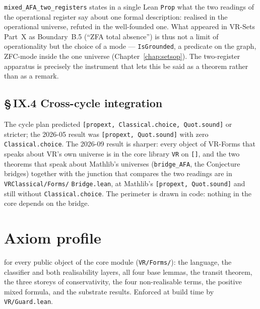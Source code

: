 \begin{remark}
\label{rem:obs9_zfa}
\leanok
{}
\texttt{mixed\_AFA\_two\_registers} states in a single Lean \texttt{Prop}
what the two readings of the operational register say about one formal
description: realised in the operational universe, refuted in the
well-founded one.  What appeared in VR-Sets Part~X as Boundary~B.5 (``ZFA
total absence'') is thus not a limit of operationality but the choice of a
mode --- \texttt{IsGrounded}, a predicate on the graph, ZFC-mode inside
the one universe (Chapter~\ref{chap:setsop}).  The two-register apparatus is
precisely the instrument that lets this be said as a theorem rather than as
a remark.
\end{remark}

\subsection*{\S\,IX.4 Cross-cycle integration}

\begin{remark}
\label{rem:obs10_zero_classical}
\leanok
The cycle plan predicted \texttt{[propext, Classical.choice, Quot.sound]}
or stricter; the 2026-05 result was \texttt{[propext, Quot.sound]} with zero
\texttt{Classical.choice}.  The 2026-09 result is sharper: every object of
VR-Forms that speaks about VR's own universe is in the core library
\texttt{VR} on \texttt{[]}, and the two theorems that speak about Mathlib's
universes (\texttt{bridge\_AFA}, the Conjecture bridges) together with the
junction that compares the two readings are in \texttt{VRClassical/Forms/}
\texttt{Bridge.lean}, at Mathlib's \texttt{[propext, Quot.sound]} and still
without \texttt{Classical.choice}.  The perimeter is drawn in code: nothing
in the core depends on the bridge.
\end{remark}

\section{Axiom profile}
\label{sec:forms_axiom_profile}

\axiomprofile{[]} for every public object of the core module
(\texttt{VR/Forms/}): the language, the classifier and both realisability
layers, all four base lemmas, the transit theorem, the three storeys of
conservativity, the four non-realisable terms, the positive mixed formula,
and the substrate results.  Enforced at build time by
\texttt{VR/Guard.lean}.

